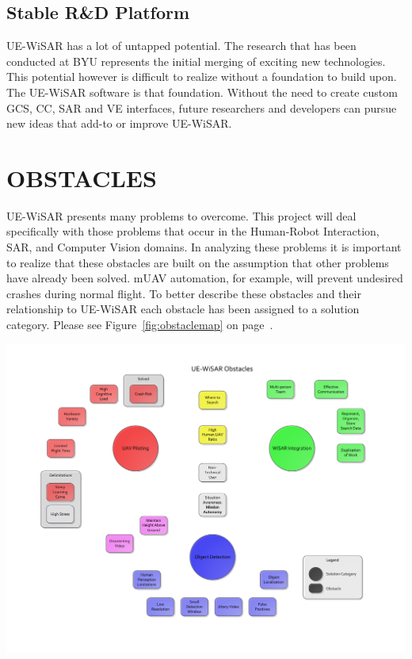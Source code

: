 \documentclass[12pt]{IEEEtran}
\begin{document}
\subsection{Stable R\&D Platform}
UE-WiSAR has a lot of untapped potential.  The research that has been conducted
at BYU represents the initial merging of exciting new technologies.  This
potential however is difficult to realize without a foundation to build upon. 
The UE-WiSAR software is that foundation.  Without the need to create custom
GCS, CC, SAR and VE interfaces, future researchers and developers can pursue
new ideas that add-to or improve UE-WiSAR.

\section{OBSTACLES}
UE-WiSAR presents many problems to overcome.  This project will
deal specifically with those problems that occur in the Human-Robot Interaction,
SAR, and Computer Vision domains.  In analyzing these problems it is important
to realize that these obstacles are built on the assumption that other problems
have already been solved.  mUAV automation, for example, will prevent undesired
crashes during normal flight.  To better describe these obstacles and their
relationship to UE-WiSAR each obstacle has been assigned to a solution category.
Please see Figure~\ref{fig:obstaclemap} on page~\pageref{fig:obstaclemap}.

\begin{mapping*}[htp]
	\vspace{-80pt}
	\hspace{-80pt}
	\includegraphics[keepaspectratio=true, width=\paperheight, height=\paperheight,
	 page=1, angle=90]{obstacle_solution_map.pdf}
	 \label{fig:obstaclemap}
\end{mapping*}
\end{document}

